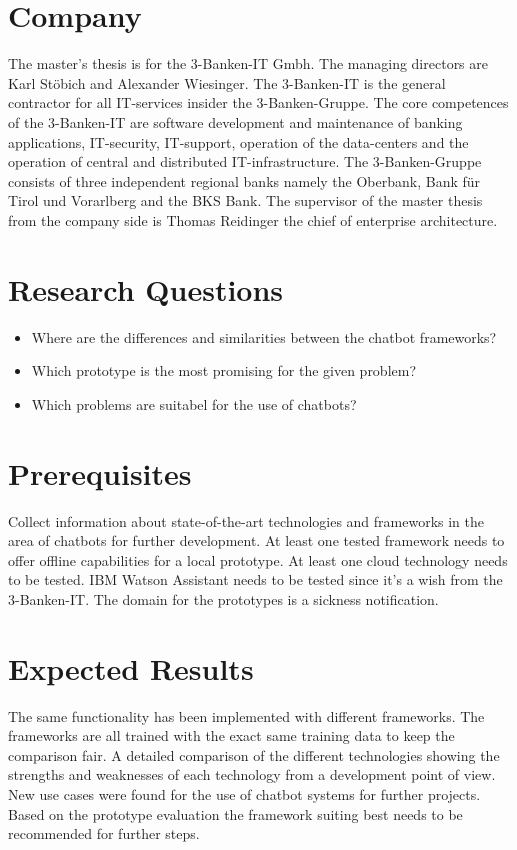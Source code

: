 \section{Company}
The master's thesis is for the 3-Banken-IT Gmbh. The managing directors are Karl St\"obich and Alexander Wiesinger. \cite{3bitorgani}
The 3-Banken-IT is the general contractor for all IT-services insider the 3-Banken-Gruppe. \cite{3bitservices}
The core competences of the 3-Banken-IT are software development and maintenance of banking applications, IT-security, IT-support, operation of the data-centers and the operation of central and distributed IT-infrastructure. \cite{3bitservices}
The 3-Banken-Gruppe consists of three independent regional banks namely the Oberbank, Bank für Tirol und Vorarlberg and the BKS Bank. \cite{3bitcompany}
The supervisor of the master thesis from the company side is Thomas Reidinger the chief of enterprise architecture.

\section{Research Questions}
\begin{itemize}
    \item Where are the differences and similarities between the chatbot frameworks?
    \item Which prototype is the most promising for the given problem?
    \item Which problems are suitabel for the use of chatbots?
\end{itemize}

\section{Prerequisites} \label{sec:prereq}
Collect information about state-of-the-art technologies and frameworks in the area of chatbots for further development.
At least one tested framework needs to offer offline capabilities for a local prototype.
At least one cloud technology needs to be tested.
IBM Watson Assistant needs to be tested since it's a wish from the 3-Banken-IT.
The domain for the prototypes is a sickness notification.


\section{Expected Results}
The same functionality has been implemented with different frameworks.
The frameworks are all trained with the exact same training data to keep the comparison fair.
A detailed comparison of the different technologies showing the strengths and weaknesses of each technology from a development point of view.
New use cases were found for the use of chatbot systems for further projects.
Based on the prototype evaluation the framework suiting best needs to be recommended for further steps.